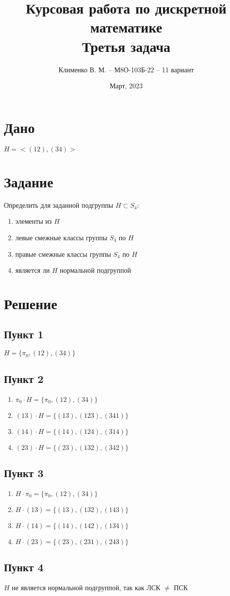 \documentclass{article}
\title{Курсовая работа по дискретной математике\\Третья задача}
\author{Клименко В. М. -- М8О-103Б-22 -- 11 вариант}
\date{Март, 2023}
\begin{document}
\maketitle


\section*{Дано}
$H = <(12), (34)>$


\section*{Задание}
Определить для заданной подгруппы $H \subset S_4$:
\begin{enumerate}
    \item элементы из $H$
    \item левые смежные классы группы $S_4$ по $H$
    \item правые смежные классы группы $S_4$ по $H$
    \item является ли $H$ нормальной подгруппой
\end{enumerate}


\section*{Решение}
\subsection*{Пункт 1}
$H = \{\pi_0, (12),(34)\}$

\subsection*{Пункт 2}
\begin{enumerate}
    \item $\pi_0 \cdot H = \{\pi_0, (12) , (34) \}$
    \item $(13)  \cdot H = \{(13) , (123), (341)\}$
    \item $(14)  \cdot H = \{(14) , (124), (314)\}$
    \item $(23)  \cdot H = \{(23) , (132), (342)\}$
\end{enumerate}

\subsection*{Пункт 3}
\begin{enumerate}
    \item $H \cdot \pi_0 = \{\pi_0, (12) , (34) \}$
    \item $H \cdot (13)  = \{(13) , (132), (143)\}$
    \item $H \cdot (14)  = \{(14) , (142), (134)\}$
    \item $H \cdot (23)  = \{(23) , (231), (243)\}$
\end{enumerate}

\subsection*{Пункт 4}
$H$ не является нормальной подгруппой, так как ЛСК $\ne$ ПСК
\end{document}
